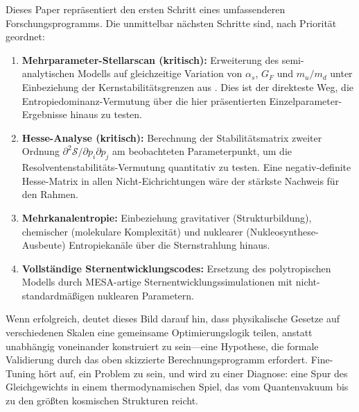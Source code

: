 \documentclass[12pt,a4paper]{article}
\theoremstyle{remark}
\begin{document}
Dieses Paper repr\"asentiert den ersten Schritt eines umfassenderen Forschungsprogramms. Die unmittelbar n\"achsten Schritte sind, nach Priorit\"at geordnet:
\begin{enumerate}
    \item \textbf{Mehrparameter-Stellarscan (kritisch):} Erweiterung des semi-analytischen Modells auf gleichzeitige Variation von $\alpha_s$, $G_F$ und $m_u/m_d$ unter Einbeziehung der Kernstabilit\"atsgrenzen aus \citep{Adams2019}. Dies ist der direkteste Weg, die Entropiedominanz-Vermutung \"uber die hier pr\"asentierten Einzelparameter-Ergebnisse hinaus zu testen.
    \item \textbf{Hesse-Analyse (kritisch):} Berechnung der Stabilit\"atsmatrix zweiter Ordnung $\partial^2 \mathcal{S}/\partial p_i \partial p_j$ am beobachteten Parameterpunkt, um die Resolventenstabilit\"ats-Vermutung quantitativ zu testen. Eine negativ-definite Hesse-Matrix in allen Nicht-Eichrichtungen w\"are der st\"arkste Nachweis f\"ur den Rahmen.
    \item \textbf{Mehrkanalentropie:} Einbeziehung gravitativer (Strukturbildung), chemischer (molekulare Komplexit\"at) und nuklearer (Nukleosynthese-Ausbeute) Entropiekan\"ale \"uber die Sternstrahlung hinaus.
    \item \textbf{Vollst\"andige Sternentwicklungscodes:} Ersetzung des polytropischen Modells durch MESA-artige Sternentwicklungssimulationen mit nicht-standardm\"a\ss{}igen nuklearen Parametern.
\end{enumerate}

Wenn erfolgreich, deutet dieses Bild darauf hin, dass physikalische Gesetze auf verschiedenen Skalen eine gemeinsame Optimierungslogik teilen, anstatt unabh\"angig voneinander konstruiert zu sein---eine Hypothese, die formale Validierung durch das oben skizzierte Berechnungsprogramm erfordert. Fine-Tuning h\"ort auf, ein Problem zu sein, und wird zu einer Diagnose: eine Spur des Gleichgewichts in einem thermodynamischen Spiel, das vom Quantenvakuum bis zu den gr\"o\ss{}ten kosmischen Strukturen reicht.

\end{document}
